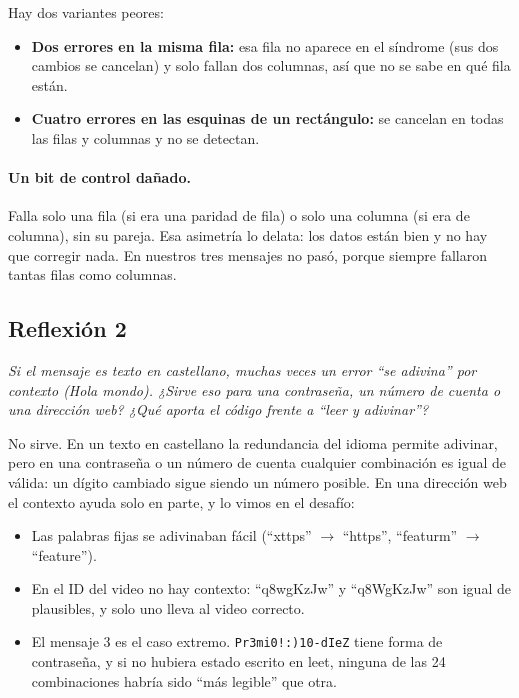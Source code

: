 \documentclass[11pt,a4paper]{article}
\begin{document}
Hay dos variantes peores:
\begin{itemize}
  \item \textbf{Dos errores en la misma fila:} esa fila no aparece en el síndrome (sus dos cambios se cancelan) y solo fallan dos columnas, así que no se sabe en qué fila están.
  \item \textbf{Cuatro errores en las esquinas de un rectángulo:} se cancelan en todas las filas y columnas y no se detectan.
\end{itemize}

\paragraph{Un bit de control dañado.} Falla solo una fila (si era una paridad de fila) o solo una columna (si era de columna), sin su pareja. Esa asimetría lo delata: los datos están bien y no hay que corregir nada. En nuestros tres mensajes no pasó, porque siempre fallaron tantas filas como columnas.

\subsection*{Reflexión 2}

\textit{Si el mensaje es texto en castellano, muchas veces un error ``se adivina'' por contexto (Hola mondo). ¿Sirve eso para una contraseña, un número de cuenta o una dirección web? ¿Qué aporta el código frente a ``leer y adivinar''?}

\medskip

No sirve. En un texto en castellano la redundancia del idioma permite adivinar, pero en una contraseña o un número de cuenta cualquier combinación es igual de válida: un dígito cambiado sigue siendo un número posible. En una dirección web el contexto ayuda solo en parte, y lo vimos en el desafío:
\begin{itemize}
  \item Las palabras fijas se adivinaban fácil (``xttps'' $\rightarrow$ ``https'', ``featurm'' $\rightarrow$ ``feature'').
  \item En el ID del video no hay contexto: ``q8wgKzJw'' y ``q8WgKzJw'' son igual de plausibles, y solo uno lleva al video correcto.
  \item El mensaje 3 es el caso extremo. \texttt{Pr3mi0!:)10-dIeZ} tiene forma de contraseña, y si no hubiera estado escrito en leet, ninguna de las 24 combinaciones habría sido ``más legible'' que otra.
\end{itemize}
\end{document}
